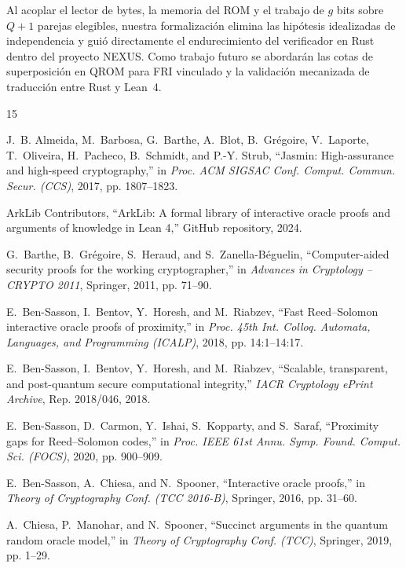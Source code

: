 \documentclass[conference]{IEEEtran}
\theoremstyle{definition}
\begin{document}
Al acoplar el lector de bytes, la memoria del ROM y el trabajo de $g$ bits sobre $Q + 1$ parejas elegibles, nuestra formalizaci\'{o}n elimina las hip\'{o}tesis idealizadas de independencia y gui\'{o} directamente el endurecimiento del verificador en Rust dentro del proyecto NEXUS. Como trabajo futuro se abordar\'{a}n las cotas de superposici\'{o}n en QROM para FRI vinculado y la validaci\'{o}n mecanizada de traducci\'{o}n entre Rust y Lean~4.

\begin{thebibliography}{15}

J.~B. Almeida, M.~Barbosa, G.~Barthe, A.~Blot, B.~Gr{\'e}goire, V.~Laporte, T.~Oliveira, H.~Pacheco, B.~Schmidt, and P.-Y. Strub, ``Jasmin: High-assurance and high-speed cryptography,'' in \emph{Proc. ACM SIGSAC Conf. Comput. Commun. Secur. (CCS)}, 2017, pp. 1807--1823.

ArkLib Contributors, ``ArkLib: A formal library of interactive oracle proofs and arguments of knowledge in {Lean 4},'' GitHub repository, 2024.

G.~Barthe, B.~Gr{\'e}goire, S.~Heraud, and S.~Zanella-B{\'e}guelin, ``Computer-aided security proofs for the working cryptographer,'' in \emph{Advances in Cryptology -- CRYPTO 2011}, Springer, 2011, pp. 71--90.

E.~Ben-Sasson, I.~Bentov, Y.~Horesh, and M.~Riabzev, ``Fast {Reed--Solomon} interactive oracle proofs of proximity,'' in \emph{Proc. 45th Int. Colloq. Automata, Languages, and Programming (ICALP)}, 2018, pp. 14:1--14:17.

E.~Ben-Sasson, I.~Bentov, Y.~Horesh, and M.~Riabzev, ``Scalable, transparent, and post-quantum secure computational integrity,'' \emph{IACR Cryptology ePrint Archive}, Rep. 2018/046, 2018.

E.~Ben-Sasson, D.~Carmon, Y.~Ishai, S.~Kopparty, and S.~Saraf, ``Proximity gaps for {Reed--Solomon} codes,'' in \emph{Proc. IEEE 61st Annu. Symp. Found. Comput. Sci. (FOCS)}, 2020, pp. 900--909.

E.~Ben-Sasson, A.~Chiesa, and N.~Spooner, ``Interactive oracle proofs,'' in \emph{Theory of Cryptography Conf. (TCC 2016-B)}, Springer, 2016, pp. 31--60.

A.~Chiesa, P.~Manohar, and N.~Spooner, ``Succinct arguments in the quantum random oracle model,'' in \emph{Theory of Cryptography Conf. (TCC)}, Springer, 2019, pp. 1--29.


\end{thebibliography}
\end{document}

